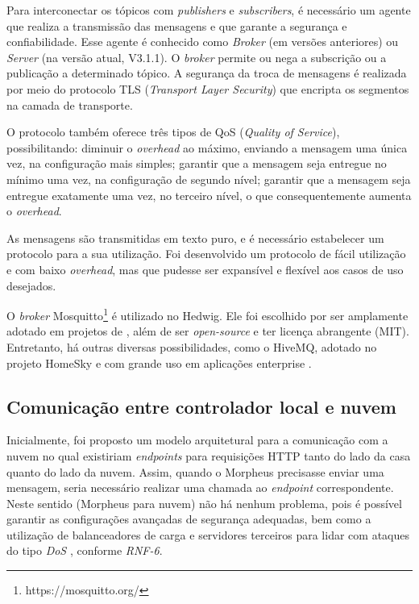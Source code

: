 Para interconectar os tópicos com \textit{publishers} e \textit{subscribers}, é necessário um agente que realiza a transmissão das mensagens e que garante a segurança e confiabilidade. Esse agente é conhecido como \emph{Broker} (em versões anteriores) ou \emph{Server} (na versão atual, V3.1.1). O \textit{broker} permite ou nega a subscrição ou a publicação a determinado tópico. A segurança da troca de mensagens é realizada por meio do protocolo TLS (\textit{Transport Layer Security}) que encripta os segmentos na camada de transporte.

O protocolo \wmqtt{} também oferece três tipos de QoS (\textit{Quality of Service}), possibilitando: diminuir o \emph{overhead} ao máximo, enviando a mensagem uma única vez, na configuração mais simples; garantir que a mensagem seja entregue no mínimo uma vez, na configuração de segundo nível; garantir que a mensagem seja entregue exatamente uma vez, no terceiro nível, o que consequentemente aumenta o \emph{overhead}.

As mensagens são transmitidas em texto puro, e é necessário estabelecer um protocolo para a sua utilização. Foi desenvolvido um protocolo de fácil utilização e com baixo \emph{overhead}, mas que pudesse ser expansível e flexível aos casos de uso desejados.

O \textit{broker} Mosquitto\footnote{https://mosquitto.org/} é utilizado no Hedwig. Ele foi escolhido por ser amplamente adotado em projetos de \wiot{}, além de ser \emph{open-source} e ter licença abrangente (MIT). Entretanto, há outras diversas possibilidades, como o HiveMQ, adotado no projeto HomeSky e com grande uso em aplicações enterprise \cite{hiveMq}.

\subsection{Comunicação entre controlador local e nuvem}

Inicialmente, foi proposto um modelo arquitetural para a comunicação com a nuvem no qual existiriam \emph{endpoints} para requisições HTTP tanto do lado da casa quanto do lado da nuvem. Assim, quando o Morpheus precisasse enviar uma mensagem, seria necessário realizar uma chamada ao \emph{endpoint} correspondente. Neste sentido (Morpheus para nuvem) não há nenhum problema, pois é possível garantir as configurações avançadas de segurança adequadas, bem como a utilização de balanceadores de carga e servidores terceiros para lidar com ataques do tipo \emph{DoS} \cite{akamai}, conforme \emph{RNF-6}.

